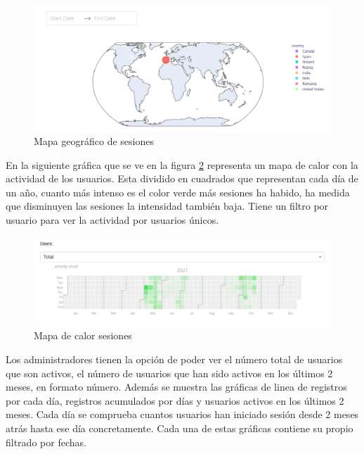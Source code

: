 \begin{figure}[H]
    \centering
    \includegraphics[width=17cm, keepaspectratio]{img/mundo.png}
    \caption{Mapa geográfico de sesiones}
    \label{fig:mundo}
\end{figure}

En la siguiente gráfica que se ve en la figura \ref{fig:activity} representa un mapa de calor con la actividad de los usuarios. Esta dividido en cuadrados que representan cada día de un año, cuanto más intenso es el color verde más sesiones ha habido, ha medida que disminuyen las sesiones la intensidad también baja. Tiene un filtro por usuario para ver la actividad por usuarios únicos.


\begin{figure}[H]
    \centering
    \includegraphics[width=17cm, keepaspectratio]{img/activity.png}
    \caption{Mapa de calor sesiones}
    \label{fig:activity}
\end{figure}
\newpage
Los administradores tienen la opción de poder ver el número total de usuarios que son activos, el número de usuarios que han sido activos en los últimos 2 meses, en formato número. Además se muestra las gráficas de linea de registros por cada día, registros acumulados por días y usuarios activos en los últimos 2 meses. Cada día se comprueba cuantos usuarios han iniciado sesión desde 2 meses atrás hasta ese día concretamente. Cada una de estas gráficas contiene su propio filtrado por fechas. 


